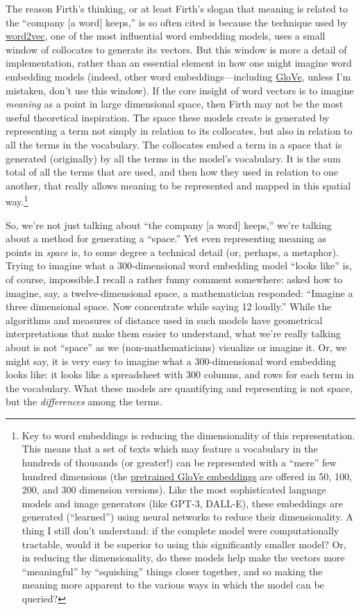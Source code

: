 \documentclass[
  12pt,
]{article}
\begin{document}
The reason Firth's thinking, or at least Firth's slogan that meaning is
related to the ``company {[}a word{]} keeps,'' is so often cited is
because the technique used by
\href{https://code.google.com/archive/p/word2vec/}{word2vec}, one of the
most influential word embedding models, uses a small window of
collocates to generate its vectors. But this window is more a detail of
implementation, rather than an essential element in how one might
imagine word embedding models (indeed, other word embeddings---including
\href{https://nlp.stanford.edu/projects/glove/}{GloVe}, unless I'm
mistaken, don't use this window). If the core insight of word vectors is
to imagine \emph{meaning} as a point in large dimensional space, then
Firth may not be the most useful theoretical inspiration. The space
these models create is generated by representing a term not simply in
relation to its collocates, but also in relation to all the terms in the
vocabulary. The collocates embed a term in a space that is generated
(originally) by all the terms in the model's vocabulary. It is the sum
total of all the terms that are used, and then how they used in relation
to one another, that really allows meaning to be represented and mapped
in this spatial way.\footnote{Key to word embeddings is reducing the
  dimensionality of this representation. This means that a set of texts
  which may feature a vocabulary in the hundreds of thousands (or
  greater!) can be represented with a ``mere'' few hundred dimensions
  (the \href{https://nlp.stanford.edu/projects/glove/}{pretrained GloVe
  embeddings} are offered in 50, 100, 200, and 300 dimension versions).
  Like the most sophisticated language models and image generators (like
  GPT-3, DALL-E), these embeddings are generated (``learned'') using
  neural networks to reduce their dimensionality. A thing I still don't
  understand: if the complete model were computationally tractable,
  would it be superior to using this significantly smaller model? Or, in
  reducing the dimensionality, do these models help make the vectors
  more ``meaningful'' by ``squishing'' things closer together, and so
  making the meaning more apparent to the various ways in which the
  model can be queried?}

So, we're not just talking about ``the company {[}a word{]} keeps,''
we're talking about a method for generating a ``space.'' Yet even
representing meaning as points in \emph{space} is, to some degree a
technical detail (or, perhaps, a metaphor). Trying to imagine what a
300-dimensional word embedding model ``looks like'' is, of course,
impossible.{I recall a rather funny comment somewhere: asked how to
imagine, say, a twelve-dimensional space, a mathematician responded:
``Imagine a three dimensional space. Now concentrate while saying 12
loudly.''} While the algorithms and measures of distance used in such
models have geometrical interpretations that make them easier to
understand, what we're really talking about is not ``space'' as we
(non-mathematicians) visualize or imagine it. Or, we might say, it is
very easy to imagine what a 300-dimensional word embedding looks like:
it looks like a spreadsheet with 300 columns, and rows for each term in
the vocabulary. What these models are quantifying and representing is
not space, but the \emph{differences} among the terms.
\end{document}
